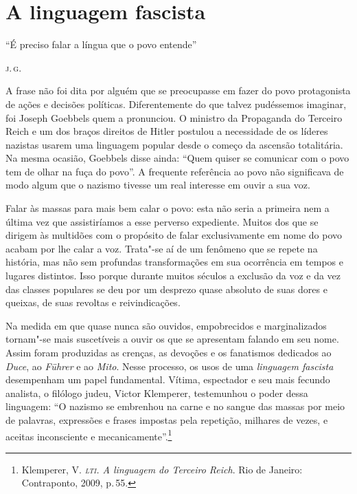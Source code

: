 \chapter[A linguagem fascista, \emph{por Carlos Piovezani}]{A linguagem fascista}


\hfill{\footnotesize ``É preciso falar a língua que o povo entende''}

\hfill{\footnotesize \textsc{j.\,g.}}


\bigskip

\noindent{}A frase não foi dita por alguém que se preocupasse em fazer do povo
protagonista de ações e decisões políticas. Diferentemente do que talvez
pudéssemos imaginar, foi Joseph Goebbels quem a pronunciou. O ministro
da Propaganda do Terceiro Reich e um dos braços direitos de Hitler
postulou a necessidade de os líderes nazistas usarem uma linguagem
popular desde o começo da ascensão totalitária. Na mesma ocasião,
Goebbels disse ainda: ``Quem quiser se comunicar com o povo tem de olhar
na fuça do povo''. A frequente referência ao povo não significava de
modo algum que o nazismo tivesse um real interesse em ouvir a sua voz.

Falar às massas para mais bem calar o povo: esta não seria a primeira
nem a última vez que assistiríamos a esse perverso expediente. Muitos
dos que se dirigem às multidões com o propósito de falar exclusivamente
em nome do povo acabam por lhe calar a voz. Trata"-se aí de um fenômeno
que se repete na história, mas não sem profundas transformações em sua
ocorrência em tempos e lugares distintos. Isso porque durante muitos
séculos a exclusão da voz e da vez das classes populares se deu por um
desprezo quase absoluto de suas dores e queixas, de suas revoltas e
reivindicações.

Na medida em que quase nunca são ouvidos, empobrecidos e marginalizados
tornam"-se mais suscetíveis a ouvir os que se apresentam falando em seu
nome. Assim foram produzidas as crenças, as devoções e os fanatismos
dedicados ao \emph{Duce}, ao \emph{Führer} e ao \emph{Mito}. Nesse
processo, os usos de uma \emph{linguagem fascista} desempenham
um papel fundamental. Vítima, espectador e seu mais fecundo analista, o
filólogo judeu, Victor Klemperer, testemunhou o poder dessa linguagem:
``O nazismo se embrenhou na carne e no sangue das massas por meio de
palavras, expressões e frases impostas pela repetição, milhares de
vezes, e aceitas inconsciente e mecanicamente''.\footnote{Klemperer, V.
  \emph{\textsc{lti}. A linguagem do Terceiro Reich}. Rio de Janeiro:
  Contraponto, 2009, p.\,55.}

